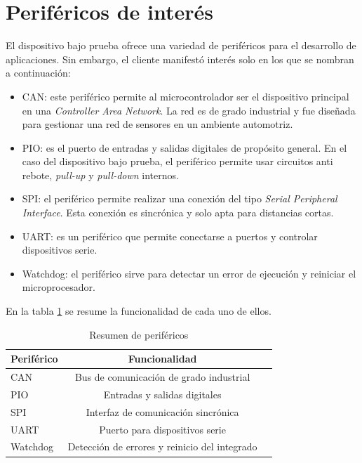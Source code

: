 \section{Periféricos de interés}
\label{sec:perifericos}

El dispositivo bajo prueba ofrece una variedad de periféricos para el desarrollo de aplicaciones.
Sin embargo, el cliente manifestó interés solo en los que se nombran a continuación:
\begin{itemize}
    \item CAN: este periférico permite al microcontrolador ser el dispositivo principal en una \emph{Controller Area Network}. La red es de grado industrial y fue diseñada para gestionar una red de sensores en un ambiente automotriz.
    \item PIO: es el puerto de entradas y salidas digitales de propósito general. En el caso del dispositivo bajo prueba, el periférico permite usar circuitos anti rebote, \emph{pull-up} y \emph{pull-down} internos. 
    \item SPI: el periférico permite realizar una conexión del tipo \emph{Serial Peripheral Interface}. Esta conexión es sincrónica y solo apta para distancias cortas.
    \item UART: es un periférico que permite conectarse a puertos y controlar dispositivos serie.
    \item Watchdog: el periférico sirve para detectar un error de ejecución y reiniciar el microprocesador.
\end{itemize}

En la tabla \ref{tab:perifericosresumen} se resume la funcionalidad de cada uno de ellos.

\begin{table}[h]
	\centering
	\caption[Resumen de periféricos]{Resumen de periféricos}
	\begin{tabular}{l c c}    
		\toprule
        \textbf{Periférico} & \textbf{Funcionalidad}\\
		\midrule
		CAN                 & Bus de comunicación de grado industrial\\        	
		PIO                 & Entradas y salidas digitales\\
		SPI                 & Interfaz de comunicación sincrónica\\
		UART                & Puerto para dispositivos serie\\
		Watchdog            & Detección de errores y reinicio del integrado\\
		\bottomrule
		\hline
	\end{tabular}
	\label{tab:perifericosresumen}
\end{table}

